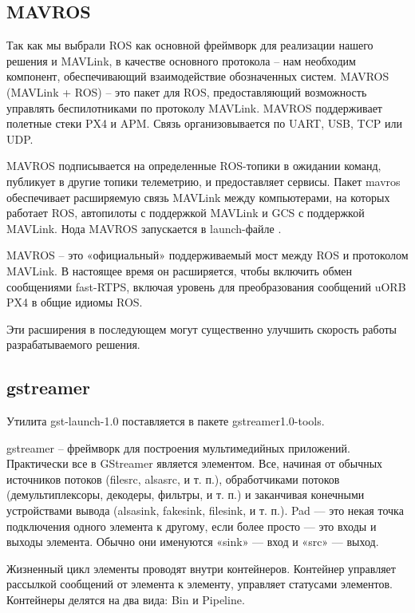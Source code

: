 \subsection{MAVROS}
Так как мы выбрали ROS как основной фреймворк для реализации нашего решения и MAVLink, в качестве основного протокола -- нам необходим компонент, обеспечивающий взаимодействие обозначенных систем.
MAVROS (MAVLink + ROS) -- это пакет для ROS, предоставляющий возможность управлять беспилотниками по протоколу MAVLink. MAVROS поддерживает полетные стеки PX4 и APM. Связь организовывается по UART, USB, TCP или UDP.

MAVROS подписывается на определенные ROS-топики в ожидании команд, публикует в другие топики телеметрию, и предоставляет сервисы.
Пакет mavros обеспечивает расширяемую связь MAVLink между компьютерами, на которых работает ROS, автопилоты с поддержкой MAVLink и GCS с поддержкой MAVLink. Нода MAVROS запускается в launch-файле \cite{clover}.

MAVROS -- это «официальный» поддерживаемый мост между ROS и протоколом MAVLink. В настоящее время он расширяется, чтобы включить обмен сообщениями fast-RTPS, включая уровень для преобразования сообщений uORB PX4 в общие идиомы ROS.

Эти расширения в последующем могут существенно улучшить скорость работы разрабатываемого решения.

\subsection{gstreamer}
Утилита gst-launch-1.0 поставляется в пакете gstreamer1.0-tools.

gstreamer -- фреймворк для построения мультимедийных приложений. Практически все в GStreamer является элементом. Все, начиная от обычных источников потоков (filesrc, alsasrc, и т. п.), обработчиками потоков (демультиплексоры, декодеры, фильтры, и т. п.) и заканчивая конечными устройствами вывода (alsasink, fakesink, filesink, и т. п.).
Pad — это некая точка подключения одного элемента к другому, если более просто — это входы и выходы элемента. Обычно они именуются «sink» — вход и «src» — выход.

Жизненный цикл элементы проводят внутри контейнеров. Контейнер управляет рассылкой сообщений от элемента к элементу, управляет статусами элементов. Контейнеры делятся на два вида: Bin и Pipeline.

